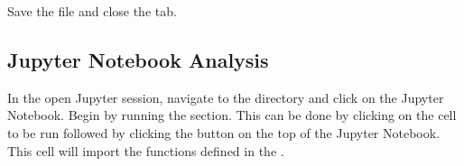 \documentclass[letterpaper,10pt,english]{sphinxhowto}
\begin{document}
\begin{sphinxVerbatim}[commandchars=\\\{\}]
   
   
   

 
 

   
   
   
   

   
   
   
   
   
   
   
   
   
   
\end{sphinxVerbatim}

\sphinxAtStartPar
Save the file and close the tab.


\subsection{Jupyter Notebook Analysis}
\label{\detokenize{index:jupyter-notebook-analysis}}
\sphinxAtStartPar
In the open Jupyter session, navigate to the  directory and click on the  Jupyter Notebook. Begin by running the  section. This can be done by clicking on the cell to be run followed by clicking the  button on the top of the Jupyter Notebook. This cell will import the functions defined in the .

\begin{sphinxVerbatim}[commandchars=\\\{\}]
 \PYG{p}{[} \PYG{p}{]}    
\end{sphinxVerbatim}
\end{document}
